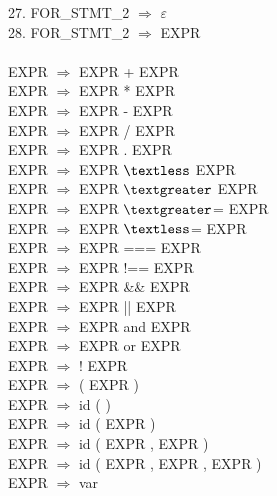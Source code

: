 \documentclass[12pt,a4paper,titlepage,final]{article}
\begin{document}
27. FOR\_STMT\_2 $\Rightarrow$ $\varepsilon$\\
28. FOR\_STMT\_2 $\Rightarrow$ EXPR\\
 \\
EXPR $\Rightarrow$ EXPR + EXPR \\
EXPR $\Rightarrow$ EXPR * EXPR \\
EXPR $\Rightarrow$ EXPR - EXPR \\
EXPR $\Rightarrow$ EXPR / EXPR \\
EXPR $\Rightarrow$ EXPR . EXPR \\
EXPR $\Rightarrow$ EXPR $\textless$ EXPR \\
EXPR $\Rightarrow$ EXPR $\textgreater$ EXPR \\
EXPR $\Rightarrow$ EXPR $\textgreater$= EXPR \\
EXPR $\Rightarrow$ EXPR $\textless$= EXPR \\
EXPR $\Rightarrow$ EXPR === EXPR \\
EXPR $\Rightarrow$ EXPR !== EXPR \\
EXPR $\Rightarrow$ EXPR \&\& EXPR \\
EXPR $\Rightarrow$ EXPR || EXPR \\
EXPR $\Rightarrow$ EXPR and EXPR \\
EXPR $\Rightarrow$ EXPR or EXPR \\
EXPR $\Rightarrow$ ! EXPR \\
EXPR $\Rightarrow$ ( EXPR ) \\
EXPR $\Rightarrow$ id ( ) \\
EXPR $\Rightarrow$ id ( EXPR )  \\
EXPR $\Rightarrow$ id ( EXPR , EXPR ) \\
EXPR $\Rightarrow$ id ( EXPR , EXPR , EXPR ) \\
EXPR $\Rightarrow$ var \\
\newpage

\end{document}
